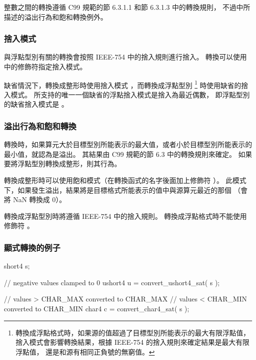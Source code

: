 整數之間的轉換遵循 C99 規範的節 6.3.1.1 和節 6.3.1.3 中的轉換規則，
不過中所描述的溢出行為和飽和轉換例外。

\subsubsection{捨入模式}

與浮點型別有關的轉換會按照 IEEE-754 中的捨入規則進行捨入。
轉換可以使用中的修飾符指定捨入模式。

{}

缺省情況下，轉換成整形時使用捨入模式 ，而轉換成浮點型別
\footnote{轉換成浮點格式時，如果源的值超過了目標型別所能表示的最大有限浮點值，
捨入模式會影響轉換結果，根據 IEEE-754 的捨入規則來確定結果是最大有限浮點值，
還是和源有相同正負號的無窮值。}
時使用缺省的捨入模式。
所支持的唯一一個缺省的浮點捨入模式是捨入為最近偶數，
即浮點型別的缺省捨入模式是 。

\subsubsection[sec:oorbasc]{溢出行為和飽和轉換}

轉換時，如果算元大於目標型別所能表示的最大值，或者小於目標型別所能表示的最小值，就認為是溢出。
其結果由 C99 規範的節 6.3 中的轉換規則來確定。
如果要將浮點型別轉換成整形，則其行為。

轉換成整形時可以使用飽和模式（在轉換函式的名字後面加上修飾符 ）。
此模式下，如果發生溢出，結果將是目標格式所能表示的值中與源算元最近的那個
（會將 NaN 轉換成 0）。

轉換成浮點型別時將遵循 IEEE-754 中的捨入規則。
轉換成浮點格式時不能使用修飾符 。

\subsubsection{顯式轉換的例子}

\startexample
\startclc
short4	s;

// negative values clamped to 0
ushort4	u = convert_ushort4_sat( s );

// values > CHAR_MAX converted to CHAR_MAX
// values < CHAR_MIN converted to CHAR_MIN
char4 c = convert_char4_sat( s );
\stopclc
\stopexample

